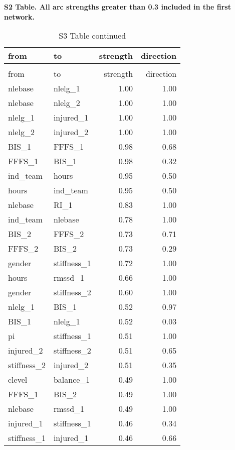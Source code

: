 \documentclass[
]{article}
\begin{document}
\newpage

\textbf{S2 Table. All arc strengths greater than 0.3 included in the first network.}

\begin{longtable}[t]{l|l|r|r}
\caption{\label{tab:unnamed-chunk-3}}\\
\hline
from & to & strength & direction\\
\hline
\endfirsthead
\caption[]{ S3 Table continued}\\
\hline
from & to & strength & direction\\
\hline
\endhead
nlebase & nlelg\_1 & 1.00 & 1.00\\
\hline
nlebase & nlelg\_2 & 1.00 & 1.00\\
\hline
nlelg\_1 & injured\_1 & 1.00 & 1.00\\
\hline
nlelg\_2 & injured\_2 & 1.00 & 1.00\\
\hline
BIS\_1 & FFFS\_1 & 0.98 & 0.68\\
\hline
FFFS\_1 & BIS\_1 & 0.98 & 0.32\\
\hline
ind\_team & hours & 0.95 & 0.50\\
\hline
hours & ind\_team & 0.95 & 0.50\\
\hline
nlebase & RI\_1 & 0.83 & 1.00\\
\hline
ind\_team & nlebase & 0.78 & 1.00\\
\hline
BIS\_2 & FFFS\_2 & 0.73 & 0.71\\
\hline
FFFS\_2 & BIS\_2 & 0.73 & 0.29\\
\hline
gender & stiffness\_1 & 0.72 & 1.00\\
\hline
hours & rmssd\_1 & 0.66 & 1.00\\
\hline
gender & stiffness\_2 & 0.60 & 1.00\\
\hline
nlelg\_1 & BIS\_1 & 0.52 & 0.97\\
\hline
BIS\_1 & nlelg\_1 & 0.52 & 0.03\\
\hline
pi & stiffness\_1 & 0.51 & 1.00\\
\hline
injured\_2 & stiffness\_2 & 0.51 & 0.65\\
\hline
stiffness\_2 & injured\_2 & 0.51 & 0.35\\
\hline
clevel & balance\_1 & 0.49 & 1.00\\
\hline
FFFS\_1 & BIS\_2 & 0.49 & 1.00\\
\hline
nlebase & rmssd\_1 & 0.49 & 1.00\\
\hline
injured\_1 & stiffness\_1 & 0.46 & 0.34\\
\hline
stiffness\_1 & injured\_1 & 0.46 & 0.66\\

\end{longtable}
\end{document}
